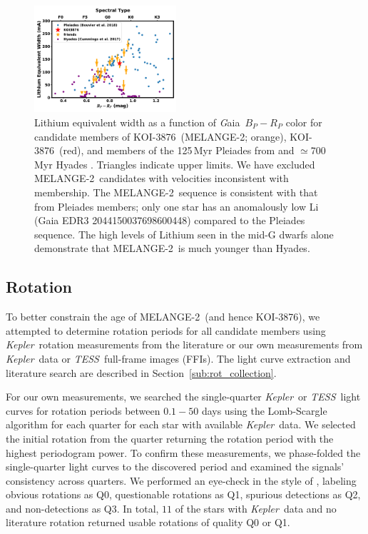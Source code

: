 \documentclass[twocolumn]{aastex631}
\newcommand{\starname}{KOI-3876}
\newcommand{\kepler}{{\it Kepler}}
\newcommand{\tess}{\textit{TESS}}
\newcommand{\gaia}{{\textit Gaia}}
\newcommand{\association}{MELANGE-2}
\begin{document}
\begin{figure}[tbh]
    \centering
    \includegraphics[width=0.47\textwidth]{lithium.pdf}
    \caption{Lithium equivalent width as a function of \gaia\ $B_P-R_P$ color for candidate members of \starname\ (\association; orange), \starname\ (red), and members of the 125\,Myr Pleiades from \citet{2018A&A...613A..63B} and $\simeq$700\,Myr Hyades \citep{2017AJ....153..128C}. Triangles indicate upper limits. We have excluded \association\ candidates with velocities inconsistent with membership. The \association\ sequence is consistent with that from Pleiades members; only one star has an anomalously low Li (Gaia EDR3 2044150037698600448) compared to the Pleiades sequence. The high levels of Lithium seen in the mid-G dwarfs alone demonstrate that \association\ is much younger than Hyades. 
    \label{fig:lithium}
    }
\end{figure} 

\subsection{Rotation}\label{sec:rotation}
To better constrain the age of \association\ (and hence \starname), we attempted to determine rotation periods for all candidate members using \kepler\ rotation measurements from the literature or our own measurements from \kepler\ data or \tess\ full-frame images (FFIs). The light curve extraction and literature search are described in Section~\ref{sub:rot_collection}. 

For our own measurements, we searched the single-quarter \kepler\ or \tess\ light curves for rotation periods between $0.1-50$ days using the Lomb-Scargle algorithm \citep{LombScargle} for each quarter for each star with available \kepler\ data. We selected the initial rotation from the quarter returning the rotation period with the highest periodogram power. To confirm these measurements, we phase-folded the single-quarter light curves to the discovered period and examined the signals' consistency across quarters. We performed an eye-check in the style of \citet{2021arXiv210613250R}, labeling obvious rotations as Q0, questionable rotations as Q1, spurious detections as Q2, and non-detections as Q3. In total, $11$ of the stars with \kepler\ data and no literature rotation returned usable rotations of quality Q0 or Q1.
\end{document}
